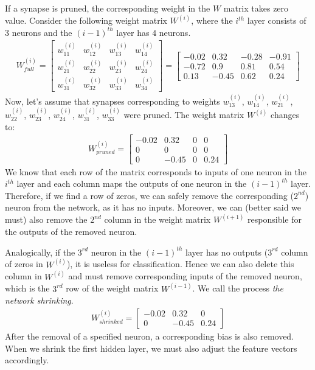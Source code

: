 If a synapse is pruned, the corresponding weight in the $ W $ matrix takes zero value. Consider the following weight matrix $ W^{(i)} $, where the $ i^{th} $ layer consists of $ 3 $ neurons and the $ (i-1)^{th} $ layer has $ 4 $ neurons.
\begin{align*}
W_{full}^{(i)} = 
\begin{bmatrix}
    w_{11}^{(i)} & w_{12}^{(i)} & w_{13}^{(i)} & w_{14}^{(i)} \\
    w_{21}^{(i)} & w_{22}^{(i)} & w_{23}^{(i)} & w_{24}^{(i)} \\
    w_{31}^{(i)} & w_{32}^{(i)} & w_{33}^{(i)} & w_{34}^{(i)}
\end{bmatrix}
=
\begin{bmatrix}
    -0.02 & 0.32 & -0.28 & -0.91 \\
    -0.72 & 0.9 & 0.81 & 0.54 \\
    0.13 & -0.45 & 0.62 & 0.24
\end{bmatrix}
\end{align*}
Now, let's assume that synapses corresponding to weights $ w_{13}^{(i)} $, $ w_{14}^{(i)} $, $ w_{21}^{(i)} $, $ w_{22}^{(i)} $, $ w_{23}^{(i)} $, $ w_{24}^{(i)} $, $ w_{31}^{(i)} $, $ w_{33}^{(i)} $ were pruned. The weight matrix $ W^{(i)} $ changes to:
\begin{align*}
W_{pruned}^{(i)} = 
\begin{bmatrix}
    -0.02 & 0.32 & 0 & 0 \\
    0 & 0 & 0 & 0 \\
    0 & -0.45 & 0 & 0.24
\end{bmatrix}
\end{align*}
We know that each row of the matrix corresponds to inputs of one neuron in the $ i^{th} $ layer and each column maps the outputs of one neuron in the $ (i-1)^{th} $ layer. Therefore, if we find a row of zeros, we can safely remove the corresponding ($ 2^{nd} $) neuron from the network, as it has no inputs. Moreover, we can (better said we must) also remove the $ 2^{nd} $ column in the weight matrix $ W^{(i+1)} $ responsible for the outputs of the removed neuron.

Analogically, if the $ 3^{rd} $ neuron in the $ (i-1)^{th} $ layer has no outputs ($ 3^{rd} $ column of zeros in $ W^{(i)} $), it is useless for classification. Hence we can also delete this column in $ W^{(i)} $ and must remove corresponding inputs of the removed neuron, which is the $ 3^{rd} $ row of the weight matrix $ W^{(i-1)} $. We call the process \textit{the network shrinking}.
\begin{align*}
W_{shrinked}^{(i)} = 
\begin{bmatrix}
    -0.02 & 0.32 & 0 \\
    0 & -0.45 & 0.24
\end{bmatrix}
\end{align*}
After the removal of a specified neuron, a corresponding bias is also removed. When we shrink the first hidden layer, we must also adjust the feature vectors accordingly.

